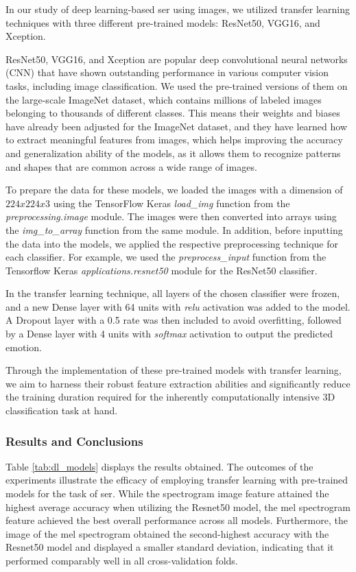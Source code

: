 In our study of deep learning-based \ac{ser} using images, we utilized transfer learning techniques with three different pre-trained models: ResNet50, VGG16, and Xception.

ResNet50, VGG16, and Xception are popular deep convolutional neural networks (CNN) that have shown outstanding performance in various computer vision tasks, including image classification. We used the pre-trained versions of them on the large-scale ImageNet dataset, which contains millions of labeled images belonging to thousands of different classes. This means their weights and biases have already been adjusted for the ImageNet dataset, and they have learned how to extract meaningful features from images, which helps improving the accuracy and generalization ability of the models, as it allows them to recognize patterns and shapes that are common across a wide range of images.

To prepare the data for these models, we loaded the images with a dimension of $224x224x3$ using the TensorFlow Keras \textit{load\_img} function from the \textit{preprocessing.image} module. The images were then converted into arrays using the \textit{img\_to\_array} function from the same module. In addition, before inputting the data into the models, we applied the respective preprocessing technique for each classifier. For example, we used the \textit{preprocess\_input} function from the Tensorflow  Keras \textit{applications.resnet50} module for the ResNet50 classifier.

In the transfer learning technique, all layers of the chosen classifier were frozen, and a new Dense layer with 64 units with \textit{relu} activation was added to the model. A Dropout layer with a 0.5 rate was then included to avoid overfitting, followed by a Dense layer with 4 units with \textit{softmax} activation to output the predicted emotion.

Through the implementation of these pre-trained models with transfer learning, we aim to harness their robust feature extraction abilities and significantly reduce the training duration required for the inherently computationally intensive 3D classification task at hand.


\subsubsection{Results and Conclusions}

Table \ref{tab:dl_models} displays the results obtained. The outcomes of the experiments illustrate the efficacy of employing transfer learning with pre-trained models for the task of \ac{ser}. While the spectrogram image feature attained the highest average accuracy when utilizing the Resnet50 model, the mel spectrogram feature achieved the best overall performance across all models. Furthermore, the image of the mel spectrogram obtained the second-highest accuracy with the Resnet50 model and displayed a smaller standard deviation, indicating that it performed comparably well in all cross-validation folds.

